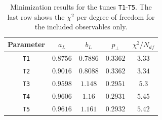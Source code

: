\documentclass[aps,preprint,floatfix,nofootinbib,showpacs]{revtex4-1}
\begin{document}
\begin{table}[!h]
 \begin{center}
  \begin{tabular}{ c | c | c | c | c }
  \hline \hline
   Parameter   & \hspace{0.8cm} $a_L$  \hspace{0.8cm} & \hspace{0.8cm} $b_L$  \hspace{0.8cm} & \hspace{0.8cm} $p_\perp$ \hspace{0.8cm}  & \hspace{0.8cm} $\chi^2/N_{df}$ \hspace{0.8cm} \\ \hline
   \texttt{T1} & $0.8756$      & $0.7886$  & $0.3362$  & $3.33$          \\ \hline
   \texttt{T2} & $0.9016$      & $0.8088$  & $0.3362$  & $3.34$          \\ \hline
   \texttt{T3} & $0.9598$      & $1.148$   & $0.2951$  & $5.3$           \\ \hline
   \texttt{T4} & $0.9606$      & $1.16$    & $0.2931$  & $5.45$          \\ \hline
   \texttt{T5} & $0.9616$      & $1.161$   & $0.2932$  & $5.42$          \\ \hline \hline
  \end{tabular}
 \end{center}
 \caption{Minimization results for the tunes \texttt{T1}-\texttt{T5}. 
 The last row shows the $\chi^2$ per degree of freedom for the included observables only.}
 \label{Table.tunes}
\end{table}
\end{document}
